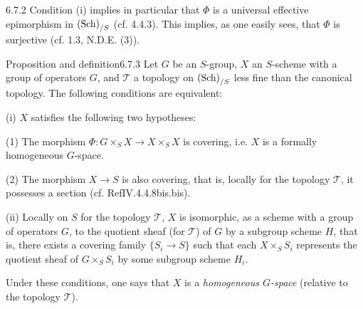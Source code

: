 \begin{remark}{6.7.2}\label{IV.6.7.2}
Condition (i) implies in particular
that \(\Phi\) is a universal
effective epimorphism in \(\textup{(Sch)}_{/S}\)
(cf. 4.4.3).
This implies, as one easily sees,
that \(\Phi\) is surjective
(cf. 1.3, N.D.E. (3)).
\end{remark}
\begin{enonce}{Proposition and definition}{6.7.3}\label{IV.6.7.3}
Let \(G\) be an \(S\)-group,
\(X\) an \(S\)-scheme with a
group of operators \(G\),
and \(\mathcal T\) a topology
on \(\textup{(Sch)}_{/S}\) less fine
than the canonical topology.
The following conditions are equivalent:

(i) \(X\) satisfies the following two hypotheses:

(1) The morphism \(\Phi:G\times_S X\to X\times_S X\)
is covering, i.e. \(X\) is a
formally homogeneous \(G\)-space.

(2) The morphism \(X\to S\)
is also covering, that is,
locally for the topology
\(\mathcal T\), it possesses
a section (cf. RefIV.4.4.8bis.bis).

(ii) \og Locally on \(S\) for
the topology \(\mathcal T\)\fg,
\(X\) is isomorphic, as a
scheme with a group of operators
\(G\), to the quotient sheaf
(for \(\mathcal T\)) of \(G\)
by a subgroup scheme \(H\),
that is, there exists a
covering family \(\{S_i\to S\}\)
such that each \(X\times_S S_i\)
represents the quotient sheaf
of \(G\times_S S_i\) by some
subgroup scheme \(H_i\).

Under these conditions, one says
that \(X\) is a \emph{homogeneous
\(G\)-space} (relative to the
topology \(\mathcal T\)).
\end{enonce}
